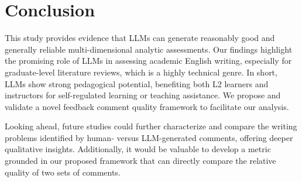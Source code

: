 \section{Conclusion\label{sec:conclusion}} 

This study provides evidence that LLMs can generate reasonably good and generally reliable multi-dimensional analytic assessments. Our findings highlight the promising role of LLMs in assessing academic English writing, especially for graduate-level literature reviews, which is a highly technical genre. In short, LLMs show strong pedagogical potential, benefiting both L2 learners and instructors for self-regulated learning or teaching assistance. We propose and validate a novel feedback comment quality framework to facilitate our analysis.



Looking ahead, future studies could further characterize and compare the writing problems identified by human- versus LLM-generated comments, offering deeper qualitative insights. Additionally, it would be valuable to develop a metric grounded in our proposed framework that can directly compare the relative quality of two sets of comments.






